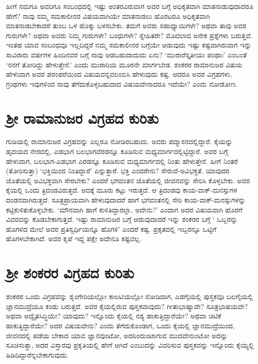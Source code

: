 ಹೀಗೆ ನಮಗೂ ಅವರಿಗೂ ಸಂಬಂಧದಲ್ಲಿ ಇಷ್ಟು ಅಂತರವಿರುವಾಗ ಅವರ ಬಗ್ಗೆ ಅಧಿಕೃತವಾಗಿ ಮಾತನಾಡುವುದಾದರೂ ಹೇಗೆ? ನಾವು ನಮ್ಮ ಸಮಕಾಲೀನರ ವಿಷಯವಾಗಿಯೇ ಮಾತನಾಡಲು ಹೊರಟರೂ ಅಧಿಕೃತವಾಗಿ ಮಾತನಾಡಬೇಕಾದರೆ ತುಂಬ ಒಳ ಹೊಕ್ಕು ಬಳಸಬೇಕು. ತಮಗೆ ಅವರು ಸಹಾಧ್ಯಾಯಿಗಳೇ? ಅಥವಾ ತಾವು ಅವರ ಗುರುಗಳೇ? ಅಥವಾ ಅವರು ನಿಮ್ಮ ಗುರುಗಳೇ? ಬಂಧುಗಳೇ? ಸ್ನೇಹಿತರೇ? ಮೊದಲಾದ ಅನೇಕ  ಪ್ರಶ್ನೆಗಳು ಬರುತ್ತವೆ. ಇಂತಹ ಯಾವ ಸಂಬಂಧವೂ ಇಲ್ಲದಿದ್ದರೆ ನಮ್ಮ ಸಮಕಾಲೀನರ ಬಗ್ಗೆಯೇ ಆಡುವುದು ಇಷ್ಟು  ಕಷ್ಟವಾಗಿರುವಾಗ ಇನ್ನು ಸಾವಿರಾರು ವರ್ಷಗಳ ಹಿಂದಿನವರ ಬಗ್ಗೆ ನಾವು ಆಡಬಹುದಾದುದು ಏನು? `ಮುರಾರೆಸ್ತೃತೀಯಃ ಪಂಥಾಃ'\label{43} ಎಂಬಂತೆ `ನನಗೆ ತೋರಿದ್ದು ಹೇಳುತ್ತೇನೆ.' ಎಂದು ಮುರಾರಿಯ ಮೂರನೇ ಮಾರ್ಗಬೇಡ. ಶಂಕರರ ರಾಮಾನುಜರ ವಿಷಯ ಹೇಳುವಾಗ ಅವರ ಪರಂಪರೆಯಿಂದ ವಿಷಯವನ್ನವಲಂಬಿಸಿ ಹೇಳುವುದು ಕಷ್ಟ. ಆದರೂ ಅವರ ವಿಗ್ರಹಗಳು, ಗ್ರಂಥಗಳು ಇವುಗಳಿಂದ ನಾವು ತೆಗೆದುಕೊಳ್ಳಬಹುದಾದ ವಿಷಯವೇನಾದರೂ ಇದೆಯೇ? ಎಂದು ನೋಡೋಣ.

\section*{ಶ್ರೀ ರಾಮಾನುಜರ ವಿಗ್ರಹದ ಕುರಿತು}

ಗುಡಿಯಲ್ಲಿ ರಾಮಾನುಜರ ವಿಗ್ರಹವನ್ನು ಎಲ್ಲರೂ ನೋಡಿರಬಹುದು. ಅವರು ಪದ್ಮಾಸನದಲ್ಲಿದ್ದಾರೆ. ಕೈಯನ್ನು ಹೃದಯದ ನೇರದಲ್ಲಿ, ಎಡಭಾಗ ಬಲಭಾಗವೆರಡನ್ನೂ ಕೂಡಿಸುವ ಮಧ್ಯಮಾರ್ಗದಲ್ಲಿಟ್ಟಿದ್ದಾರೆ. ಅವರ ಬಗ್ಗೆ ಹೇಳುವಾಗ, ಬಲಭಾಗ-ಎಡಭಾಗ ಎರಡನ್ನೂ ಕೂಡಿಸುವ ಮಧ್ಯಮಾರ್ಗದಲ್ಲಿ ನಿಂತು ಹೇಳುತ್ತೇನೆ. ಹೀಗೆ ನಿಂತರೆ (ತೋರಿಸುತ್ತಾ) `ಭಕ್ತಿಯಿಂದ ನಿಂತಿದ್ದಾರೆ' ಎನ್ನುತ್ತಾರೆ. ಭಕ್ತಿ ಎಂದರೇನು? ಸೇರುವೆ-ಅವಿಭಕ್ತತೆ. ಯಾವುದರ ಜೊತೆಯಲ್ಲಿ ಅವಿಭಕ್ತವಾಗಿ ಸೇರಬೇಕು? ಎಂದರೆ ಭಗವಂತನ ಜೊತೆಯಲ್ಲಿ ಜೀವನವನ್ನು ಸೇರಿಸಿ ಕೊಳ್ಳಬೇಕು. ಅವರ ಕೈಯಲ್ಲಿ ಒಂದು ತ್ರಿದಂಡವಿರುತ್ತದೆ. ಅದಕ್ಕೆ ಮೂರು ಕಟ್ಟು ಇರುತ್ತದೆ. ಆ ತ್ರಿದಂಡವು ಕಾಯ-ವಾಕ್-ಮನಸ್ಸುಗಳ ದಂಡನವಾಗಿರುತ್ತದೆ. ಸೂತ್ರಪ್ರಾಯವಾಗಿ ಹೇಳುವುದಾದರೆ ಹಾಗೆ ಭಗವಂತನಲ್ಲಿ ಸೇರಿ ಕಾಯ-ವಾಕ್-ಮನಸ್ಸುಗಳನ್ನು ಕಟ್ಟಿಕುಳಿತುಕೊಳ್ಳಬೇಕು. `ಮೌನವಾಗಿ ಹಾಗೆ ಕುಳಿತಿದ್ದಾರಲ್ಲಾ, ಅದೇನು?' ಎಂದಾಗ ಅದರ ವಿಷಯವಾಗಿ ಹೊರಗೆ ವಿವರವನ್ನು ಕೊಡಬೇಕಾಗುತ್ತದೆ. ಇಷ್ಟು ರಾಮಾನುಜರ ಬಗ್ಗೆ ಆಡುವುದಾದರೆ ಇನ್ನು ಶಂಕರರ ಬಗ್ಗೆ ` ಒಬ್ಬರನ್ನು ಹೊಗಳಿದ ಮೇಲೆ ಅವರ ಪ್ರತಿಸ್ವರ್ಧಿಯನ್ನೂ ಹೊಗಳಿ' ಎಂದರೆ ಕಷ್ಟ. ಪ್ರಕೃತದಲ್ಲಿ ಇಬ್ಬರನ್ನೂ ಒಟ್ಟಿಗೆ ಹೊಗಳಬೇಕಾಗಿದೆ. ಅವರ ಕೃಪೆ ಇದ್ದ ಪಕ್ಷೇ ಅದೇನೂ ಕಷ್ಟವಲ್ಲ.

\section*{ಶ್ರೀ ಶಂಕರರ ವಿಗ್ರಹದ ಕುರಿತು}

ಶಂಕರರ ಒಂದು ವಿಗ್ರಹವನ್ನು ಶೃಂಗೇರಿಯಲ್ಲೋ ಕಾಲಟಿಯಲ್ಲೋ ನೋಡಿದಾಗ, ಎಡಗೈಯಲ್ಲಿ ಪುಸ್ತಕವೂ ಬಲಗೈಯಲ್ಲಿ ಜ್ಞಾನಮುದ್ರೆಯೂ ಕಂಡು ಬರುತ್ತದೆ. ಅವರ ಕೈಯಲ್ಲಿರುವ ಪುಸ್ತಕವಾವುದು? ಗೀತಾಭಾಷ್ಯಾವೇ? ಸೂತ್ರಭಾಷಯವೇ? ಅಥವಾ ಅದ್ವೈತಸಿದ್ಧಿಯೇ? ಯಾವುದು? ಇನ್ನೊಂದು ಕೈಯಲ್ಲಿ ನಶ್ಯ ಹಾಕುತ್ತಿದ್ದಾರೆಯೇ? ಅಥವಾ ಚಿಟಿಕೆ ಹಾಕುತ್ತಿದ್ದಾರೆಯೇ? ಅದರ ವಿಷಯವೇನು? ಎಂದು ತೆಗೆದುಕೊಂಡಾಗ, ಒಂದು ಕೈಯಲ್ಲಿ  ಜ್ಞಾನಮುದ್ರೆಯಿಂದ, ಜೀವನದಲ್ಲಿ ಪಡೆಯ ಬೇಕಾದ ಯಾವ ಜ್ಞಾನವುಂಟೋ, ಅದರಿಂದುಂಟಾಗುವ ಮುದವೇನುಂಟೋ ಅದನ್ನು ಸೂಚಿಸುತ್ತಾ, ಅದರ ವಿಸ್ತಾರವು ಪ್ರಕೃತಿಯಲ್ಲಿ ಹೇಗೆ ಆಗಿದೆ ಎಂಬುದನ್ನು ವಿವರಿಸುವ ಪುಸ್ತಕವನ್ನು  ಇನ್ನೊಂದು ಕೈಯ್ಯಲ್ಲಿ ಹಿಡಿದಿದ್ದಾರೆನ್ನಬೇಕಾಗುವುದು.

